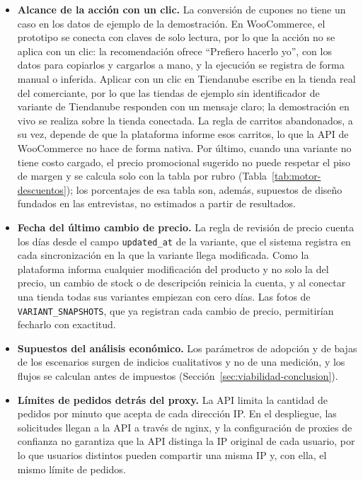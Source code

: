\begin{itemize}
    \item \textbf{Alcance de la acción con un clic.} La conversión de cupones no tiene un caso en los datos de ejemplo de la demostración. En WooCommerce, el prototipo se conecta con claves de solo lectura, por lo que la acción no se aplica con un clic: la recomendación ofrece \enquote{Prefiero hacerlo yo}, con los datos para copiarlos y cargarlos a mano, y la ejecución se registra de forma manual o inferida. Aplicar con un clic en Tiendanube escribe en la tienda real del comerciante, por lo que las tiendas de ejemplo sin identificador de variante de Tiendanube responden con un mensaje claro; la demostración en vivo se realiza sobre la tienda conectada. La regla de carritos abandonados, a su vez, depende de que la plataforma informe esos carritos, lo que la API de WooCommerce no hace de forma nativa. Por último, cuando una variante no tiene costo cargado, el precio promocional sugerido no puede respetar el piso de margen y se calcula solo con la tabla por rubro (Tabla~\ref{tab:motor-descuentos}); los porcentajes de esa tabla son, además, supuestos de diseño fundados en las entrevistas, no estimados a partir de resultados.
    \item \textbf{Fecha del último cambio de precio.} La regla de revisión de precio cuenta los días desde el campo \texttt{updated\_at} de la variante, que el sistema registra en cada sincronización en la que la variante llega modificada. Como la plataforma informa cualquier modificación del producto y no solo la del precio, un cambio de stock o de descripción reinicia la cuenta, y al conectar una tienda todas sus variantes empiezan con cero días. Las fotos de \texttt{VARIANT\_SNAPSHOTS}, que ya registran cada cambio de precio, permitirían fecharlo con exactitud.
    \item \textbf{Supuestos del análisis económico.} Los parámetros de adopción y de bajas de los escenarios surgen de indicios cualitativos y no de una medición, y los flujos se calculan antes de impuestos (Sección~\ref{sec:viabilidad-conclusion}).
    \item \textbf{Límites de pedidos detrás del proxy.} La API limita la cantidad de pedidos por minuto que acepta de cada dirección IP. En el despliegue, las solicitudes llegan a la API a través de nginx, y la configuración de proxies de confianza no garantiza que la API distinga la IP original de cada usuario, por lo que usuarios distintos pueden compartir una misma IP y, con ella, el mismo límite de pedidos.
\end{itemize}

